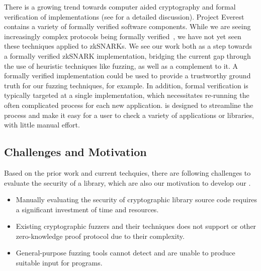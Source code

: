 There is a growing trend towards computer aided cryptography and formal verification of implementations (see \cite{barbosa2021sok} for a detailed discussion).  Project Everest~\cite{projecteverest} contains a variety of formally verified software components.  While we are seeing increasingly complex protocols being formally verified~\cite{protzenko2019formally}, we have not yet seen these techniques applied to zkSNARKs.  We see our work both as a step towards a formally verified zkSNARK implementation, bridging the current gap through the use of heuristic techniques like fuzzing, as well as a complement to it.  A formally verified implementation could be used to provide a trustworthy ground truth for our fuzzing techniques, for example.  In addition, formal verification is typically targeted at a single implementation, which necessitates re-running the often complicated process for each new application.  \snarkprobe is designed to streamline the process and make it easy for a user to check a variety of applications or libraries, with little manual effort.

\subsection{Challenges and Motivation}
Based on the prior work and current techquies, there are following challenges to evaluate the security of a \zksnark library, which are also our motivation to develop our \snarkprobe.
\begin{itemize}[leftmargin=*]
    \setlength{\itemsep}{0pt}
    \setlength{\parskip}{0pt}
		\item Manually evaluating the security of cryptographic library source code requires a significant investment of time and resources.
        \item Existing cryptographic fuzzers and their techniques does not support \zksnark or other zero-knowledge proof protocol due to their complexity.
        \item General-purpose fuzzing tools cannot detect \textit{} and are unable to produce suitable input for \zksnark programs.
\end{itemize}

